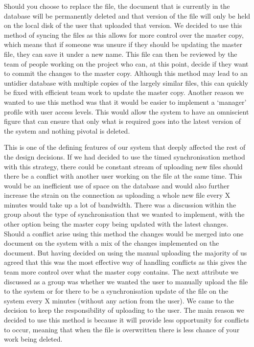 \documentclass[11pt]{article}
\begin{document}
Should you choose to replace the file, the document that is currently in the database will be permanently deleted and that version of the file will only be held on the local disk of the user that uploaded that version. We decided to use this method of syncing the files as this allows for more control over the master copy, which means that if someone was unsure if they should be updating the master file, they can save it under a new name. This file can then be reviewed by the team of people working on the project who can, at this point, decide if they want to commit the changes to the master copy. Although this method may lead to an untidier database with multiple copies of the largely similar files, this can quickly be fixed with efficient team work to update the master copy. Another reason we wanted to use this method was that it would be easier to implement a ‘manager’ profile with user access levels. This would allow the system to have an omniscient figure that can ensure that only what is required goes into the latest version of the system and nothing pivotal is deleted. 

This is one of the defining features of our system that deeply affected the rest of the design decisions. If we had decided to use the timed synchronisation method with this strategy, there could be constant stream of uploading new files should there be a conflict with another user working on the file at the same time. This would be an inefficient use of space on the database and would also further increase the strain on the connection as uploading a whole new file every X minutes would take up a lot of bandwidth. There was a discussion within the group about the type of synchronisation that we wanted to implement, with the other option being the master copy being updated with the latest changes. Should a conflict arise using this method the changes would be merged into one document on the system with a mix of the changes implemented on the document. But having decided on using the manual uploading the majority of us agreed that this was the most effective way of handling conflicts as this gives the team more control over what the master copy contains.
The next attribute we discussed as a group was whether we wanted the user to manually upload the file to the system or for there to be a synchronisation update of the file on the system every X minutes (without any action from the user). We came to the decision to keep the responsibility of uploading to the user. The main reason we decided to use this method is because it will provide less opportunity for conflicts to occur, meaning that when the file is overwritten there is less chance of your work being deleted.
\end{document}
